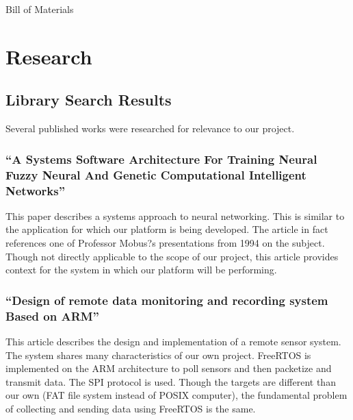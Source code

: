 \documentclass{article}
\begin{document}
        \begin{table}[htb]
            \centering
            
            \caption{Bill of Materials}
            \label{tab:bom}
        \end{table}

\FloatBarrier
\section{Research} %

    \subsection{Library Search Results} %
        \label{sec:research}
        
            Several published works were researched for relevance to our project.
            
            \subsubsection{``A Systems Software Architecture
            For Training Neural Fuzzy Neural
            And Genetic Computational Intelligent Networks''%
            \cite{neural}}
            
                This paper describes a systems approach to neural networking.
                This is similar to the application
                for which our platform is being developed.
                The article in fact references one of Professor Mobus?s
                presentations from 1994 on the subject.
                Though not directly applicable to the scope of our project,
                this article provides context for the system
                in which our platform will be performing.

            \subsubsection{``Design of remote data monitoring
            and recording system Based on ARM''%
            \cite{remote}}

                This article describes the design and implementation
                of a remote sensor system.
                The system shares many characteristics of our own project.
                FreeRTOS is implemented on the ARM architecture
                to poll sensors and then packetize and transmit data.
                The SPI protocol is used.
                Though the targets are different than our own
                (FAT file system instead of POSIX computer),
                the fundamental problem of collecting
                and sending data using FreeRTOS is the same.
                
\end{document}
